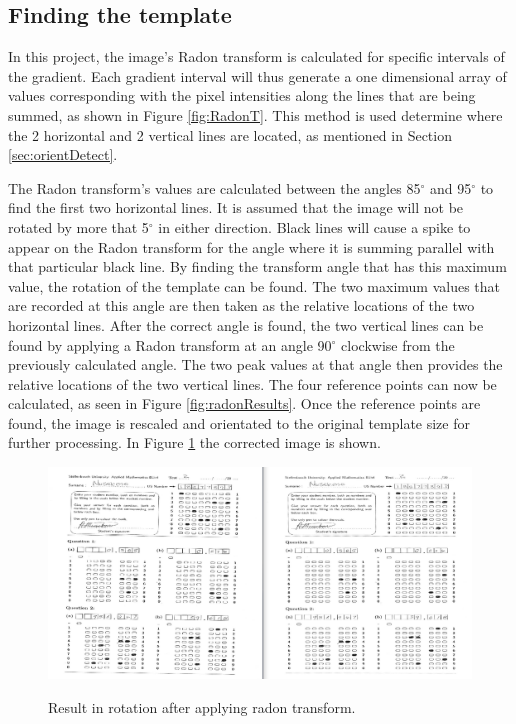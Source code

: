 \subsection{Finding the template}
\label{sec:findTemplate}

In this project, the image's Radon transform is calculated for specific intervals of the gradient. Each gradient interval will thus generate a one dimensional array of values corresponding with the pixel intensities along the lines that are being summed, as shown in Figure \ref{fig:RadonT}. This method is used determine where the 2 horizontal and 2 vertical lines are located, as mentioned in Section \ref{sec:orientDetect}. 

The Radon transform's values are calculated between the angles 85$^{\circ}$ and 95$^{\circ}$ to find the first two horizontal lines. It is assumed that the image will not be rotated by more that 5$^{\circ}$ in either direction. Black lines will cause a spike to appear on the Radon transform for the angle where it is summing parallel with that particular black line. By finding the transform angle that has this maximum value, the rotation of the template can be found. The two maximum values that are recorded at this angle are then taken as the relative locations of the two horizontal lines. After the correct angle is found, the two vertical lines can be found by applying a Radon transform at an angle 90$^{\circ}$ clockwise from the previously calculated angle. The two peak values at that angle then provides the relative locations of the two vertical lines. The four reference points can now be calculated, as seen in Figure \ref{fig:radonResults}. Once the reference points are found, the image is rescaled and orientated to the original template size for further processing. In Figure \ref{fig:rotate} the corrected image is shown.

\begin{figure}
  \centering
  \includegraphics[width=14cm]{Rotation}\\
  \caption{Result in rotation after applying radon transform.}
  \label{fig:rotate}
\end{figure}

